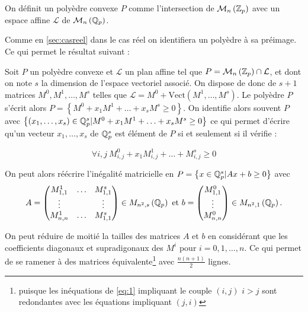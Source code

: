 \begin{definition}
	
On définit un polyèdre convexe $P$ comme l'intersection de $\mathcal{M}_n \left(  \mathbb {Z}_p  \right)$ avec un espace affine $\mathcal{L} $ de $\mathcal{M}_n\left( \mathbb{Q}_p \right) $. 
\end{definition}
Comme en \ref{sec:casreel} dans le cas réel on identifiera un polyèdre à sa préimage. Ce qui permet le résultat suivant :


Soit $P$ un polyèdre convexe et $\mathcal{L} $ un plan affine tel que $P = \mathcal{M}_n \left(  \mathbb {Z}_p  \right) \cap \mathcal{L}$, et dont on note $s$ la dimension de l'espace vectoriel associé. On dispose de donc de $s +1 $ matrices $M^0,M^1,\ldots, M^s$ telles que $\mathcal{L} = M^0 + \text{Vect}\left( M^1,\ldots,M^s \right)$. Le polyèdre $P$ s'écrit alors $P = \left\{ M^0 + x_1 M^1 + \ldots + x_s M^s \ge 0 \right\}$. On identifie alors souvent $P$ avec $\left\{ \left( x_1,\ldots,x_s \right) \in \mathbb{Q}_p^s |M^0 + x_1 M^1 + \ldots + x_s M^s \ge 0 \right\}$ ce qui permet d'écrire qu'un vecteur $x_1,\ldots,x_s$ de $\mathbb{Q}_p^s$ est élément de $P$ si et seulement si il vérifie :
 
	\begin{equation}
	\label{eq:1} 
\forall i,j ~  M^0_{i,j} + x_1 M^1_{i,j} + \ldots + M^s_{i,j} \ge 0
	\end{equation}

On peut alors réécrire l'inégalité matricielle en  $P = \left\{ x \in \mathbb{Q}_p^s \-| Ax + b \ge 0 \right\} $ avec 
\[A = \begin{pmatrix} M^1_{1,1} & \ldots & M^s_{1,1} \\
\vdots & & \vdots \\
M^1_{n,n} & \ldots & M^s_{1,1}\\ \end{pmatrix} \in M_{n^2,s}\left( \mathbb{Q}_p \right) \text{ et } 
b = \begin{pmatrix} M^0_{1,1} \\
\vdots\\
M^0_{n,n} \end{pmatrix} \in M_{n^2, 1}\left( \mathbb{Q}_p \right) 
.\]  
\begin{remarque}
	On peut réduire de moitié la tailles des matrices $A$ et $b$ en considérant que les coefficients diagonaux et supradigonaux des $M^i$ pour $i = 0,1,\ldots,n$. Ce qui permet de se ramener à des matrices équivalente\footnote{puisque les inéquations de \ref{eq:1} impliquant le couple $(i,j)$ $i>j$ sont redondantes avec les équations impliquant $(j,i)$}  avec $\frac{n(n+1)}{2}$ lignes.  
\end{remarque}

